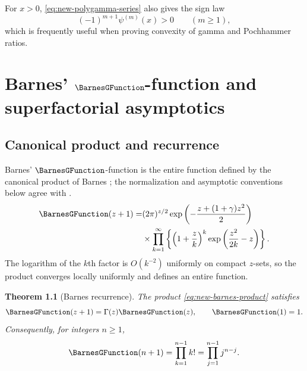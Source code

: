 \documentclass[11pt,a4paper,oneside,openany]{book}
\newtheorem{theorem}{Theorem}[chapter]
\theoremstyle{definition}
\theoremstyle{remark}
\begin{document}
For $x>0$, \eqref{eq:new-polygamma-series} also gives the sign law
\begin{equation}\label{eq:new-polygamma-sign}
 (-1)^{m+1}\psi^{(m)}(x)>0\qquad(m\ge1),
\end{equation}
which is frequently useful when proving convexity of gamma and Pochhammer
ratios.

\chapter{Barnes' \texorpdfstring{$\BarnesGFunction$}{G}-function and superfactorial asymptotics}
\label{ch:barnes-g}

\section{Canonical product and recurrence}

Barnes' $\BarnesGFunction$-function is the entire function defined by the canonical product
of Barnes \cite{Barnes1900}; the normalization and asymptotic conventions below
agree with \cite{NISTDLMF}.
\begin{align}
 \BarnesGFunction(z+1)=&(2\pi)^{z/2}
 \exp\left(-\frac{z+(1+\gamma)z^2}{2}\right)
 \notag\\
 &\times\prod_{k=1}^{\infty}
 \left\{\left(1+\frac zk\right)^k
 \exp\left(\frac{z^2}{2k}-z\right)\right\}.
 \label{eq:new-barnes-product}
\end{align}
The logarithm of the $k$th factor is $O(k^{-2})$ uniformly on compact
$z$-sets, so the product converges locally uniformly and defines an entire
function.

\begin{theorem}[Barnes recurrence]\label{thm:new-barnes-recurrence}
The product \eqref{eq:new-barnes-product} satisfies
\begin{equation}\label{eq:new-barnes-recurrence}
 \BarnesGFunction(z+1)=\Gamma(z)\BarnesGFunction(z),\qquad \BarnesGFunction(1)=1.
\end{equation}
Consequently, for integers $n\ge1$,
\begin{equation}\label{eq:new-barnes-integers}
 \BarnesGFunction(n+1)=\prod_{k=1}^{n-1}k!
 =\prod_{j=1}^{n-1}j^{n-j}.
\end{equation}
\end{theorem}
\end{document}
